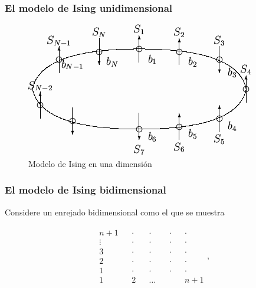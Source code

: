 \documentclass{beamer}
\begin{document}
\begin{frame}
\frametitle{El modelo de Ising unidimensional}

\begin{figure}
\centering
\includegraphics[scale=0.5]{fig/Ising1D.png}
\caption{Modelo de Ising en una dimensión}
\end{figure}

\end{frame}

%
\begin{frame}
\frametitle{El modelo de Ising bidimensional}

Considere un enrejado bidimensional como el que se muestra

\begin{eqnarray}
  \begin{matrix}
  n+1 && \cdot && \cdot && \cdot && \cdot  \\
  \vdots && \cdot && \cdot && \cdot && \cdot  \\
  3 && \cdot && \cdot && \cdot && \cdot  \\
  2 && \cdot && \cdot && \cdot && \cdot  \\
  1 && \cdot && \cdot && \cdot && \cdot  \\
  1 && 2 &&   \dots&&  && n+1
  \end{matrix}, \nonumber
  \end{eqnarray}
\end{frame}
%
\end{document}
